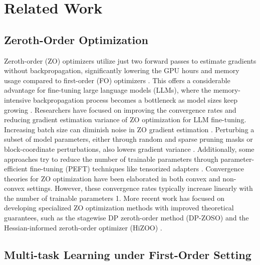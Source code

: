 \section{Related Work}
\subsection{Zeroth-Order Optimization}
Zeroth-order (ZO) optimizers utilize just two forward passes to estimate gradients without backpropagation, significantly lowering the GPU hours and memory usage compared to first-order (FO) optimizers \citep{tang2024private}. This offers a considerable advantage for fine-tuning large language models (LLMs), where the memory-intensive backpropagation process becomes a bottleneck as model sizes keep growing \citep{yang2024adazeta}.
Researchers have focused on improving the convergence rates and reducing gradient estimation variance of ZO optimization for LLM fine-tuning. Increasing batch size can diminish noise in ZO gradient estimation \citep{gautam2024variance}. Perturbing a subset of model parameters, either through random and sparse pruning masks or block-coordinate perturbations, also lowers gradient variance \citep{guo2024zeroth}. Additionally, some approaches try to reduce the number of trainable parameters through parameter-efficient fine-tuning (PEFT) techniques like tensorized adapters \citep{yang2024adazeta}.
Convergence theories for ZO optimization have been elaborated in both convex and non-convex settings. However, these convergence rates typically increase linearly with the number of trainable parameters 1. More recent work has focused on developing specialized ZO optimization methods with improved theoretical guarantees, such as the stagewise DP zeroth-order method (DP-ZOSO) \citep{liu2024differentially} and the Hessian-informed zeroth-order optimizer (HiZOO) \citep{zhao2024second}.

\subsection{Multi-task Learning under First-Order Setting}

